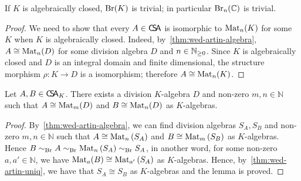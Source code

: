 \begin{theorem}
  \label{thm:br-triv-alg-closed}
  If $K$ is algebraically closed, $\operatorname{Br}(K)$ is trivial; in particular $\operatorname{Br}_{n}(\mathbb{C})$ is trivial.
  \leanok
\end{theorem}
\begin{proof}
  We need to show that every $A\in\operatorname{\mathsf{C}\!\mathsf{S}\!\mathsf{A}}$ is isomorphic to $\operatorname{Mat}_{n}(K)$ for some $K$ when $K$ is algebraically closed. Indeed, by~\cref{thm:wed-artin-algebra}, $A \cong \operatorname{Mat}_{n}(D)$ for some division algebra $D$ and $n\in\mathbb{N}_{\ge0}$. Since $K$ is algebraically closed and $D$ is an integral domain and finite dimensional, the structure morphism $\rho: K\to D$ is a isomorphism; therefore $A\cong \operatorname{Mat}_{n}(K)$.
\end{proof}

\begin{lemma}
  \label{lem:common-div-alg}
  \leanok
  Let $A, B \in \operatorname{\mathsf{C}\!\mathsf{S}\!\mathsf{A}}_{K}$. There exists a division $K$-algebra $D$ and non-zero $m,n\in\mathbb{N}$ such that $A\cong\operatorname{Mat}_{m}(D)$ and $B\cong\operatorname{Mat}_{n}(D)$ as $K$-algebras.
\end{lemma}

\begin{proof}
  By~\cref{thm:wed-artin-algebra}, we can find division algebras $S_{A}, S_{B}$ and non-zero $m, n\in\mathbb{N}$ such that $A\cong\operatorname{Mat}_{n}\left(S_{A}\right)$ and $B\cong\operatorname{Mat}_{m}\left(S_{B}\right)$ as $K$-algebras. Hence $B\sim_{\operatorname{Br}}A\sim_{\operatorname{Br}}\operatorname{Mat}_{n}\left(S_{A}\right)\sim_{\operatorname{Br}}S_{A}$, in another word, for some non-zero $a, a'\in\mathbb{N}$, we have $\operatorname{Mat}_{a}(B)\cong\operatorname{Mat}_{a'}\left(S_{A}\right)$ as $K$-algebras. Hence, by~\cref{thm:wed-artin-uniq}, we have that $S_{A}\cong S_{B}$ as $K$-algebras and the lemma is proved.
\end{proof}

